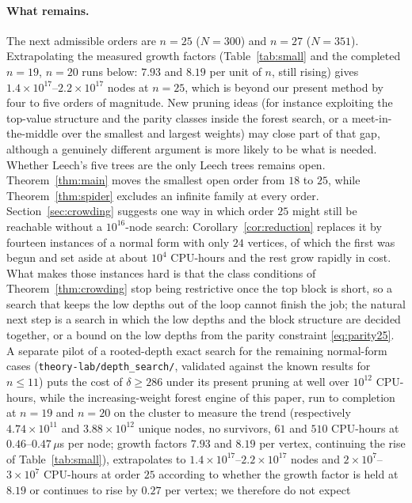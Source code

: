 \documentclass[11pt,a4paper]{article}
\theoremstyle{plain}
\theoremstyle{remark}
\newcommand{\file}[1]{\texttt{#1}}
\begin{document}
\paragraph{What remains.}
The next admissible orders are $n=25$ ($N=300$) and $n=27$ ($N=351$).
Extrapolating the measured growth factors (Table~\ref{tab:small} and the
completed $n=19$, $n=20$ runs below: $7.93$ and $8.19$ per unit of $n$, still
rising) gives $1.4\times10^{17}$--$2.2\times10^{17}$ nodes at $n=25$, which is
beyond our present method by four to five orders of magnitude.  New pruning
ideas (for instance exploiting the top-value structure and the parity classes
inside the forest search, or a meet-in-the-middle over the smallest and largest
weights) may close part of that gap, although a genuinely different argument is
more likely to be what is needed.  Whether Leech's five trees are
the only Leech trees remains open.  Theorem~\ref{thm:main} moves the smallest
open order from $18$ to $25$, while Theorem~\ref{thm:spider} excludes an
infinite family at every order.  Section~\ref{sec:crowding} suggests one way in
which order $25$ might still be reachable without a $10^{16}$-node search:
Corollary~\ref{cor:reduction} replaces it by fourteen instances of a normal
form with only $24$ vertices, of which the first was begun and set aside at
about $10^4$ CPU-hours and the rest grow rapidly in cost.  What makes those instances hard is that the class conditions
of Theorem~\ref{thm:crowding} stop being restrictive once the top block is
short, so a search that keeps the low depths out of the loop cannot finish the
job; the natural next step is a search in which the low depths and the block
structure are decided together, or a bound on the low depths from the parity
constraint \eqref{eq:parity25}.  A separate pilot of a rooted-depth exact
search for the remaining normal-form cases
(\file{theory-lab/depth\_search/}, validated against the known results for
$n\le11$) puts the cost of $\delta\ge286$ under its present pruning at well over
$10^{12}$ CPU-hours, while the increasing-weight forest engine of this paper, run to completion
at $n=19$ and $n=20$ on the cluster to measure the trend (respectively
$4.74\times10^{11}$ and $3.88\times10^{12}$ unique nodes, no survivors, $61$ and
$510$ CPU-hours at $0.46$--$0.47\,\mu$s per node; growth factors $7.93$ and $8.19$ per
vertex, continuing the rise of Table~\ref{tab:small}), extrapolates to
$1.4\times10^{17}$--$2.2\times10^{17}$ nodes and $2\times10^{7}$--$3\times10^{7}$
CPU-hours at order $25$ according to whether the growth factor is held at
$8.19$ or continues to rise by $0.27$ per vertex; we therefore do not expect
\end{document}
